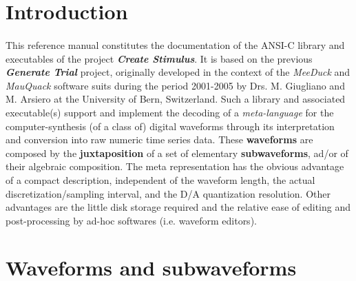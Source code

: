 

\section{Introduction}

\paragraph{}
This reference manual constitutes the documentation of the ANSI-C library and executables of the project
\textbf{\textit{Create Stimulus}}. It is based on the previous \textbf{\textit{Generate Trial}} project, originally
developed in the context of the \textit{MeeDuck} and \textit{MauQuack} software suits during the period 2001-2005 by
Drs. M. Giugliano and M. Arsiero at the University of Bern, Switzerland. Such a library and associated executable(s)
support and implement the decoding of a \textit{meta-language} for the computer-synthesis (of a class of) digital
waveforms through its interpretation and conversion into raw numeric time series data. These \textbf{waveforms} are
composed by the \textbf{juxtaposition} of a set of elementary \textbf{subwaveforms}, ad/or of their algebraic
composition. The meta representation has the obvious advantage of a compact description, independent of the waveform
length, the actual discretization/sampling interval, and the D/A quantization resolution. Other advantages are the
little disk storage required and the relative ease of editing and post-processing by ad-hoc softwares (i.e. waveform
editors).

\section{Waveforms and subwaveforms}
